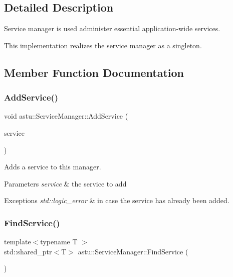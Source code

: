 \subsection{Detailed Description}
Service manager is used administer essential application-\/wide services.

This implementation realizes the service manager as a singleton. 

\subsection{Member Function Documentation}
\mbox{\label{classastu_1_1ServiceManager_a7c6743f699e8468c2102d2f84745de97}} 
\subsubsection{\texorpdfstring{Add\+Service()}{AddService()}}
{\footnotesize\ttfamily void astu\+::\+Service\+Manager\+::\+Add\+Service (\begin{DoxyParamCaption}\item[{std\+::shared\+\_\+ptr$<$ \hyperlink{classastu_1_1IService}{I\+Service} $>$}]{service }\end{DoxyParamCaption})}

Adds a service to this manager.


\begin{DoxyParams}{Parameters}
{\em service} & the service to add \\
\hline
\end{DoxyParams}

\begin{DoxyExceptions}{Exceptions}
{\em std\+::logic\+\_\+error} & in case the service has already been added. \\
\hline
\end{DoxyExceptions}
\mbox{\label{classastu_1_1ServiceManager_acef5ab6b48a9811b810851c69751f71a}} 
\subsubsection{\texorpdfstring{Find\+Service()}{FindService()}}
{\footnotesize\ttfamily template$<$typename T $>$ \\
std\+::shared\+\_\+ptr$<$T$>$ astu\+::\+Service\+Manager\+::\+Find\+Service (\begin{DoxyParamCaption}{ }\end{DoxyParamCaption})\hspace{0.3cm}{\ttfamily [inline]}}

